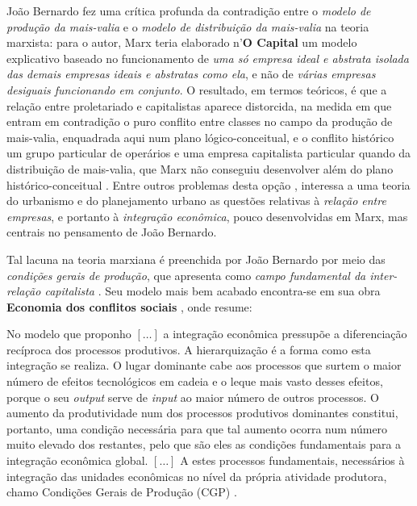 João Bernardo fez uma crítica profunda da contradição entre o \textit{modelo de produção da mais-valia} e o \textit{modelo de distribuição da mais-valia} na teoria marxista: para o autor, Marx teria elaborado n'\textbf{O Capital} um modelo explicativo baseado no funcionamento de \textit{uma só empresa ideal e abstrata isolada das demais empresas ideais e abstratas como ela}, e não de \textit{várias empresas desiguais funcionando em conjunto}. O resultado, em termos teóricos, é que a relação entre proletariado e capitalistas aparece distorcida, na medida em que entram em contradição o puro conflito entre classes no campo da produção de mais-valia, enquadrada aqui num plano lógico-conceitual, e o conflito histórico um grupo particular de operários e uma empresa capitalista particular quando da distribuição de mais-valia, que Marx não conseguiu desenvolver além do plano histórico-conceitual \cite[p.~10-11]{BERNARDO1977b}. Entre outros problemas desta opção \cite[p.~7-21]{BERNARDO1977b}, interessa a uma teoria do urbanismo e do planejamento urbano as questões relativas à \textit{relação entre empresas}, e portanto à \textit{integração econômica}, pouco desenvolvidas em Marx, mas centrais no pensamento de João Bernardo.

Tal lacuna na teoria marxiana é preenchida por João Bernardo por meio das \textit{condições gerais de produção}, que apresenta como \textit{campo fundamental da inter-relação capitalista} \cite[p.~110-115]{BERNARDO1977b}. Seu modelo mais bem acabado encontra-se em sua obra \textbf{Economia dos conflitos sociais} \cite{BERNARDO1991}, onde resume:

\begin{citacao}
No modelo que proponho \([\dots]\) a integração econômica pressupõe a diferenciação recíproca dos processos produtivos. A hierarquização é a forma como esta integração se realiza. O lugar dominante cabe aos processos que surtem o maior número de efeitos tecnológicos em cadeia e o leque mais vasto desses efeitos, porque o seu \textit{output} serve de \textit{input} ao maior número de outros processos. O aumento da produtividade num dos processos produtivos dominantes constitui, portanto, uma condição necessária para que tal aumento ocorra num número muito elevado dos restantes, pelo que são eles as condições fundamentais para a integração econômica global. \([\dots]\) A estes processos fundamentais, necessários à integração das unidades econômicas no nível da própria atividade produtora, chamo Condições Gerais de Produção (CGP) \cite[p.~157-158]{BERNARDO1991}.
\end{citacao}

